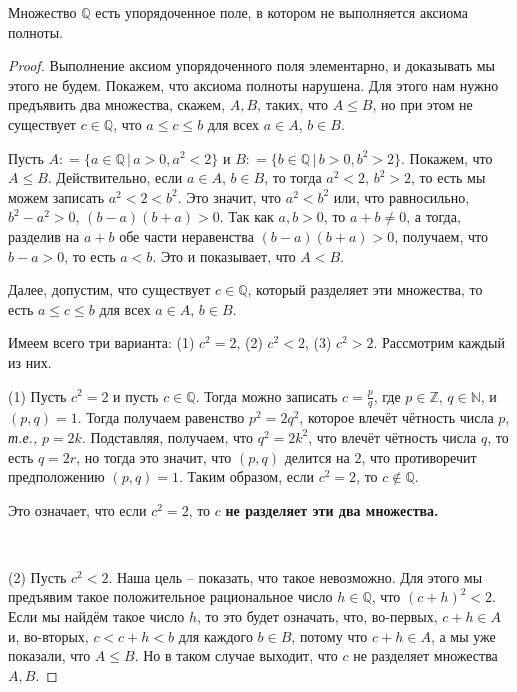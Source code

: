 \begin{proposition}
    Множество $\mathbb{Q}$ есть упорядоченное поле, в котором не выполняется аксиома полноты.
\end{proposition}
\begin{proof}
    Выполнение аксиом упорядоченного поля элементарно, и доказывать мы этого не будем. Покажем, что аксиома полноты нарушена. Для этого нам нужно предъявить два множества, скажем, $A,B$, таких, что $A \le B$, но при этом не существует $c\in \mathbb{Q}$, что $a\le c \le b$ для всех $a\in A$, $b\in B.$

    Пусть $A: = \{a \in \mathbb{Q}\, | \, a >0, a^2 <2\}$ и $B: = \{b \in \mathbb{Q}\, |\, b>0, b^2 >2\}$. Покажем, что $A\le B$. Действительно, если $a\in A$, $b \in B$, то тогда $a^2 <2$, $b^2 >2$, то есть мы можем записать $a^2<2<b^2$. Это значит, что $a^2<b^2$ или, что равносильно, $b^2-a^2>0$, $(b-a)(b+a)>0$. Так как $a,b >0$, то $a+b \ne 0$, а тогда, разделив на $a+b$ обе части неравенства $(b-a)(b+a)>0$, получаем, что $b-a >0$, то есть $a<b$. Это и показывает, что $A<B$.

    Далее, допустим, что существует $c \in \mathbb{Q}$, который разделяет эти множества, то есть $a\le c \le b$ для всех $a\in A$, $b\in B.$

    Имеем всего три варианта: (1) $c^2 = 2$, (2) $c^2 <2$, (3) $c^2 >2$. Рассмотрим каждый из них.
    
(1) Пусть $c^2 =2$ и пусть $c\in \mathbb{Q}$. Тогда можно записать $c = \frac{p}{q}$, где $p \in \mathbb{Z}$, $q \in \mathbb{N}$, и $(p,q) = 1$. Тогда получаем равенство $p^2 = 2q^2$, которое влечёт чётность числа $p$, \textit{т.е.,} $p = 2k$. Подставляя, получаем, что $q^2 = 2k^2$, что влечёт чётность числа $q$, то есть $q = 2r$, но тогда это значит, что $(p,q)$ делится на $2$, что противоречит предположению $(p,q) =1$. Таким образом, если $c^2 = 2$, то $c\notin \mathbb{Q}$.\\

\centerline{
{\color{red}Это означает, что если $c^2=2$, то $c$ \textbf{не разделяет эти два множества.}}}~
    
(2) Пусть $c^2 <2$. Наша цель -- показать, что такое невозможно. Для этого мы предъявим такое положительное рациональное число $h\in \mathbb{Q}$, что $(c+h)^2 <2$. Если мы найдём такое число $h$, то это будет означать, что, во-первых, $c+h \in A$ и, во-вторых, $c < c+h <b$ для каждого $b \in B$, потому что $c+h \in A$, а мы уже показали, что $A \le B$. Но в таком случае выходит, что $c$ не разделяет множества $A,B$.


\end{proof}
